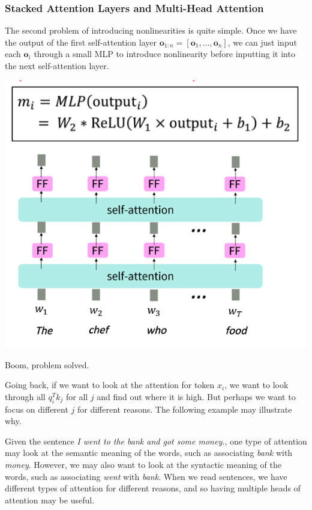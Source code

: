  \subsubsection{Stacked Attention Layers and Multi-Head Attention}

    The second problem of introducing nonlinearities is quite simple. Once we have the output of the first self-attention layer $\mathbf{o}_{1:n} = [\mathbf{o}_1, \ldots, \mathbf{o}_n]$, we can just input each $\mathbf{o}_i$ through a small MLP to introduce nonlinearity before inputting it into the next self-attention layer. 

    \begin{center}
      \includegraphics[scale=0.4]{img/stacked_self_attention_layers.png}
    \end{center}

    Boom, problem solved. 

    Going back, if we want to look at the attention for token $x_i$, we want to look through all $q_i^T k_j$ for all $j$ and find out where it is high. But perhaps we want to focus on different $j$ for different reasons. The following example may illustrate why. 

    \begin{example}
      Given the sentence \textit{I went to the bank and got some money.}, one type of attention may look at the semantic meaning of the words, such as associating \textit{bank} with \textit{money}. However, we may also want to look at the syntactic meaning of the words, such as associating \textit{went} with \textit{bank}. When we read sentences, we have different types of attention for different reasons, and so having multiple heads of attention may be useful. 
    \end{example}

